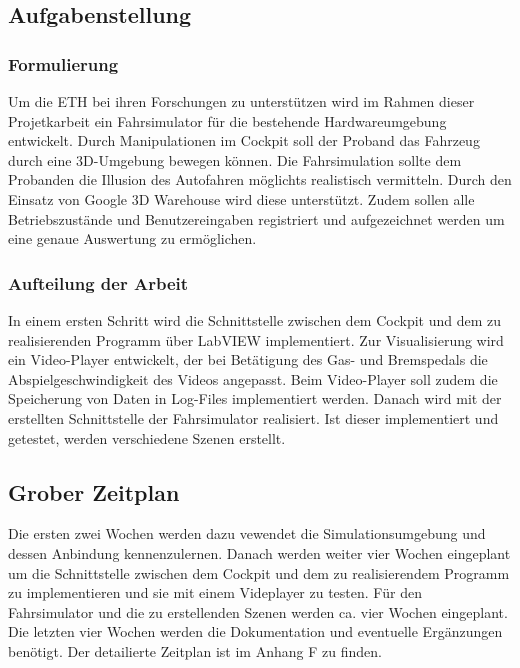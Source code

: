 \subsection{Aufgabenstellung}
\subsubsection{Formulierung}
Um die ETH bei ihren Forschungen zu unterstützen wird im Rahmen dieser Projetkarbeit ein Fahrsimulator für die bestehende Hardwareumgebung entwickelt. Durch Manipulationen im Cockpit soll der Proband das Fahrzeug durch eine 3D-Umgebung bewegen können. Die Fahrsimulation sollte dem Probanden die Illusion des Autofahren möglichts realistisch vermitteln. Durch den Einsatz von Google 3D Warehouse wird diese unterstützt. Zudem sollen alle Betriebszustände und Benutzereingaben registriert und aufgezeichnet werden um eine genaue Auswertung zu ermöglichen. 

\subsubsection{Aufteilung der Arbeit}
In einem ersten Schritt wird die Schnittstelle zwischen dem Cockpit und dem zu realisierenden Programm über LabVIEW implementiert. Zur Visualisierung wird ein Video-Player entwickelt, der bei Betätigung des Gas- und Bremspedals die Abspielgeschwindigkeit des Videos angepasst. Beim Video-Player soll zudem die Speicherung von Daten in Log-Files  implementiert werden. Danach wird mit der erstellten Schnittstelle der Fahrsimulator realisiert. Ist dieser implementiert und getestet, werden verschiedene Szenen erstellt. 

\subsection{Grober Zeitplan}
Die ersten zwei Wochen werden dazu vewendet die Simulationsumgebung und dessen Anbindung kennenzulernen. Danach werden weiter vier Wochen eingeplant um die Schnittstelle zwischen dem Cockpit und dem zu realisierendem Programm zu implementieren und sie mit einem Videplayer zu testen. Für den Fahrsimulator und die zu erstellenden Szenen werden ca. vier Wochen eingeplant. Die letzten vier Wochen werden die Dokumentation und eventuelle Ergänzungen benötigt. Der detailierte Zeitplan ist im Anhang F zu finden.